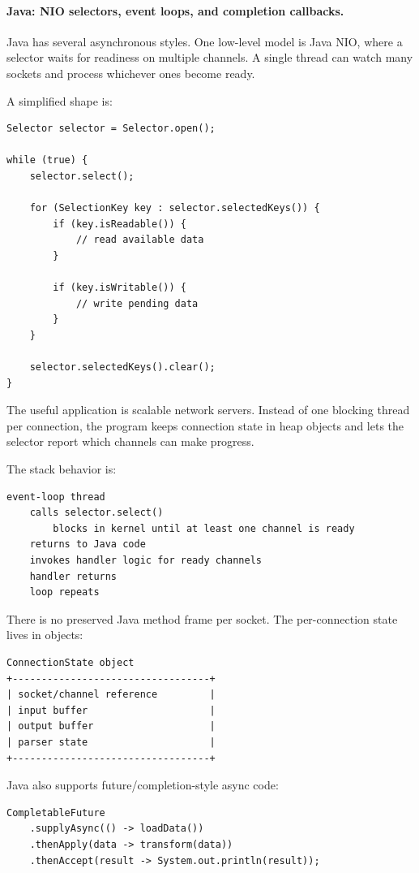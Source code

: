 \paragraph{Java: NIO selectors, event loops, and completion callbacks.}

Java has several asynchronous styles. One low-level model is Java NIO, where a selector waits for readiness on multiple channels. A single thread can watch many sockets and process whichever ones become ready.

A simplified shape is:

\begin{verbatim}
Selector selector = Selector.open();

while (true) {
    selector.select();

    for (SelectionKey key : selector.selectedKeys()) {
        if (key.isReadable()) {
            // read available data
        }

        if (key.isWritable()) {
            // write pending data
        }
    }

    selector.selectedKeys().clear();
}
\end{verbatim}

The useful application is scalable network servers. Instead of one blocking thread per connection, the program keeps connection state in heap objects and lets the selector report which channels can make progress.

The stack behavior is:

\begin{verbatim}
event-loop thread
    calls selector.select()
        blocks in kernel until at least one channel is ready
    returns to Java code
    invokes handler logic for ready channels
    handler returns
    loop repeats
\end{verbatim}

There is no preserved Java method frame per socket. The per-connection state lives in objects:

\begin{verbatim}
ConnectionState object
+----------------------------------+
| socket/channel reference         |
| input buffer                     |
| output buffer                    |
| parser state                     |
+----------------------------------+
\end{verbatim}

Java also supports future/completion-style async code:

\begin{verbatim}
CompletableFuture
    .supplyAsync(() -> loadData())
    .thenApply(data -> transform(data))
    .thenAccept(result -> System.out.println(result));
\end{verbatim}

